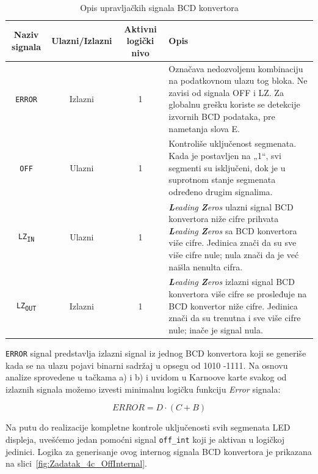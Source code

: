 \documentclass[a4paper,11pt]{article}
\numberwithin{equation}{section} %
\begin{document}
\begin{table}[!ht]
  \centering
  \caption{Opis upravljačkih signala BCD konvertora}
  \label{tab:signali-bcd}
  \begin{tabularx}{\linewidth}{|c|c|c|X|}
    \hline
    \rowcolor{gray!40}
    Naziv signala & Ulazni/Izlazni & Aktivni logički nivo & Opis \\ \hline

    \texttt{ERROR} & Izlazni & 1 &
    Označava nedozvoljenu kombinaciju na podatkovnom ulazu tog bloka. Ne zavisi od signala OFF i LZ. Za globalnu grešku koriste se detekcije izvornih BCD podataka, pre nametanja slova E. \\ \hline

    \texttt{OFF} & Ulazni & 1 &
    Kontroliše uključenost segmenata. Kada je postavljen na „1“, svi segmenti su isključeni,
    dok je u suprotnom stanje segmenata određeno drugim signalima. \\ \hline

    \texttt{LZ\textsubscript{IN}} & Ulazni & 1 &
    \textit{\textbf{L}eading \textbf{Z}eros} ulazni signal BCD konvertora niže cifre prihvata \textit{\textbf{L}eading \textbf{Z}eros}
    sa BCD konvertora više cifre. Jedinica znači da su sve više cifre nule; nula znači da je već naišla nenulta cifra. \\ \hline

    \texttt{LZ\textsubscript{OUT}} & Izlazni & 1 &
    \textit{\textbf{L}eading \textbf{Z}eros} izlazni signal BCD konvertora više cifre se prosleđuje na BCD konvertor niže cifre.
    Jedinica znači da su trenutna i sve više cifre nule; inače je signal nula. \\ \hline

  \end{tabularx}
\end{table}

\texttt{ERROR} signal predstavlja izlazni signal iz jednog BCD konvertora koji se generiše kada
se na ulazu pojavi binarni sadržaj u opsegu od 1010 -1111. Na osnovu analize sprovedene u
tačkama a) i b) i uvidom u Karnoove karte svakog od izlaznih signala možemo izvesti
minimalnu logičku funkciju \textit{Error} signala:

\begin{equation}\label{eq:error}
ERROR = D \cdot (C + B)
\end{equation}

Na putu do realizacije kompletne kontrole uključenosti svih segmenata LED displeja,
uvešćemo jedan pomoćni signal \texttt{off\_int} koji je aktivan u logičkoj jedinici. Logika za generisanje ovog internog signala BCD konvertora je prikazana na slici~\ref{fig:Zadatak_4c_OffInternal}.
\end{document}
